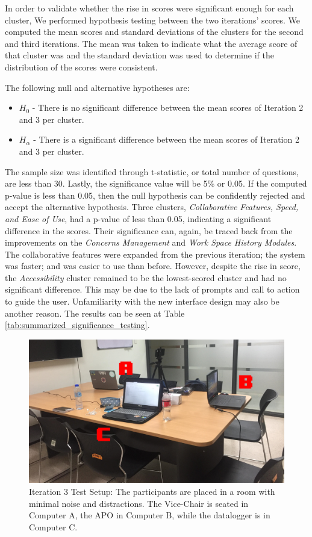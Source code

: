 In order to validate whether the rise in scores were significant enough for each cluster, We performed hypothesis testing between the two iterations' scores. We computed the mean scores and standard deviations of the clusters for the second and third iterations. The mean was taken to indicate what the average score of that cluster was and the standard deviation was used to determine if the distribution of the scores were consistent.

The following null and alternative hypotheses are: 
 \label{list:significance_testing}
 \begin{itemize}
    \item $H_0$ - There is no significant difference between the mean scores of Iteration 2 and 3 per cluster.
    \item $H_\alpha$ - There is a significant difference between the mean scores of Iteration 2 and 3 per cluster.
\end{itemize}
The sample size was identified through t-statistic, or total number of questions, are less than 30. Lastly, the significance value will be 5\% or 0.05. If the computed p-value is less than 0.05, then the null hypothesis can be confidently rejected and accept the alternative hypothesis. Three clusters, \textit{Collaborative Features, Speed, and Ease of Use}, had a p-value of less than 0.05, indicating a significant difference in the scores. Their significance can, again, be traced back from the improvements on the \textit{Concerns Management} and \textit{Work Space History Modules}. The collaborative features were expanded from the previous iteration; the system was faster; and was easier to use than before. However, despite the rise in score, the \textit{Accessibility} cluster remained to be the lowest-scored cluster and had no significant difference. This may be due to the lack of prompts and call to action to guide the user. Unfamiliarity with the new interface design may also be another reason. The results can be seen at Table \ref{tab:summarized_significance_testing}.

\begin{figure}[h]
   \centering
   \includegraphics[scale=0.2]{PCSC2019_latex/Tests/test_setup_iteration3.png}
   \caption{Iteration 3 Test Setup: The participants are placed in a room with minimal noise and distractions. The Vice-Chair is seated in Computer A, the APO in Computer B, while the datalogger is in Computer C.}
    \label{fig:itr3_testsetup}
\end{figure}
